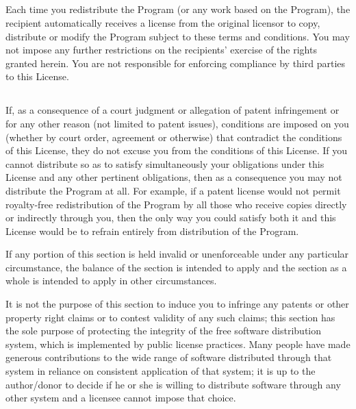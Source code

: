 \documentclass[a4paper, 12pt]{article}
\begin{document}
\subsection{}

Each time you redistribute the Program (or any work based on the Program), the recipient automatically receives a license from the original licensor to copy, distribute or modify the Program subject to these terms and conditions. You may not impose any further restrictions on the recipients' exercise of the rights granted herein. You are not responsible for enforcing compliance by third parties to this License.

\subsection{}

If, as a consequence of a court judgment or allegation of patent infringement or for any other reason (not limited to patent issues), conditions are imposed on you (whether by court order, agreement or otherwise) that contradict the conditions of this License, they do not excuse you from the conditions of this License. If you cannot distribute so as to satisfy simultaneously your obligations under this License and any other pertinent obligations, then as a consequence you may not distribute the Program at all. For example, if a patent license would not permit royalty-free redistribution of the Program by all those who receive copies directly or indirectly through you, then the only way you could satisfy both it and this License would be to refrain entirely from distribution of the Program.

\vspace{0.3cm}

If any portion of this section is held invalid or unenforceable under any particular circumstance, the balance of the section is intended to apply and the section as a whole is intended to apply in other circumstances.

\vspace{0.3cm}

It is not the purpose of this section to induce you to infringe any patents or other property right claims or to contest validity of any such claims; this section has the sole purpose of protecting the integrity of the free software distribution system, which is implemented by public license practices. Many people have made generous contributions to the wide range of software distributed through that system in reliance on consistent application of that system; it is up to the author/donor to decide if he or she is willing to distribute software through any other system and a licensee cannot impose that choice.
\end{document}
